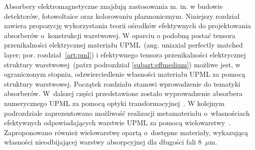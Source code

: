 Absorbery elektromagnetyczne znajdują zastosowania m. in. w budowie detektorów, fotowoltaice oraz kolorowaniu plazmonicznym. Niniejszy rozdział zawiera propozycję wykorzystania teorii ośrodków efektywnych do projektowania absorberów o~konstrukcji warstwowej. W oparciu o podobną postać tensora przenikalności elektrycznej materiału UPML~(ang. uniaxial perfectly matched layer; por. rozdział~\ref{art:pml}) i efektywnego tensora przenikalności elektrycznej struktury warstwowej~(patrz podrozdział \ref{subart:effmedium}) możliwe jest, w ograniczonym stopniu, odzwierciedlenie własności materiału UPML za pomocą struktury warstwowej. Początek rozdziału stanowi wprowadzenie do tematyki absorberów. W~dalszej części przedstawione zostało wyprowadzenie absorbera numerycznego UPML za pomocą optyki transformacyjnej~\cite{pendry2012transformation}. W kolejnym podrozdziale zaprezentowano możliwość realizacji metamateriału o~własnościach efektywnych odpowiadających warstwie UPML za pomocą wielowarstwy~\cite{ania2015}. Zaproponowano również wielowarstwę opartą o~dostępne materiały, wykazującą własności nieodbijającej warstwy absorpcyjnej dla długości fali $8$~$\mu$m.


